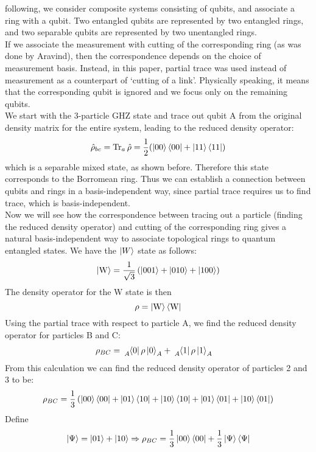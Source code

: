 \documentclass{scrartcl}
\begin{document}
 following, we consider composite systems consisting of qubits, and associate a ring
 with a qubit. Two entangled qubits are represented by two entangled rings, and two separable qubits are represented by two unentangled rings.\\[0.3cm] If we associate the measurement with cutting of the corresponding ring (as was done by Aravind), then the correspondence  depends on the choice of measurement basis. Instead, in this paper, partial trace was used instead of measurement as a counterpart of `cutting of a link'. Physically speaking, it means that the corresponding qubit is ignored and we focus only on the remaining qubits.\\[0.3cm]
We start with the 3-particle GHZ state and trace out qubit A from the original density matrix for the entire system, leading to the reduced density operator:
\[
\hat{\rho}_{bc} = \Tr_a\hat{\rho} = \frac{1}{2}(\ket{00}\bra{00}+\ket{11}\bra{11})
\]
which is a separable mixed state, as shown before. Therefore this state corresponds to the Borromean ring. Thus we can establish a connection between qubits and rings in a basis-independent way, since partial trace requires us to find trace, which is basis-independent.\\[0.3cm]
Now we will see how the correspondence between tracing out a particle (finding the reduced density operator) and cutting of the corresponding ring gives a natural basis-independent way to associate topological rings to quantum entangled states. We have the $\ket{W}$ state as follows:
\[
\ket{\mathrm{W}} = \frac{1}{\sqrt{3}}\left( \ket{001}+\ket{010}+\ket{100} \right)
\]
The density operator for the W state is then $$\rho = \ket{\mathrm{W}}\bra{\mathrm{W}}$$
Using the partial trace with respect to particle A, we find the reduced density operator for particles B and C: 
\begin{align*}
    \rho_{BC} &= \tensor[_A]{\bra{0}\rho\ket{0}}{_A} + \tensor[_A]{\bra{1}\rho\ket{1}}{_A}
\end{align*}
From this calculation we can find the reduced density operator of particles 2 and 3 to be:
\[
 \rho_{BC} = \frac{1}{3}\left( \ket{00}\bra{00}+\ket{01}\bra{10}+\ket{10}\bra{10}+\ket{01}\bra{01}+\ket{10}\bra{01} \right)
\]
Define
\[
\ket{\Psi} = \ket{01}+\ket{10}\Rightarrow \rho_{BC} = \frac{1}{3}\ket{00}\bra{00}+\frac{1}{3}\ket{\Psi}\bra{\Psi}
\]
\end{document}
